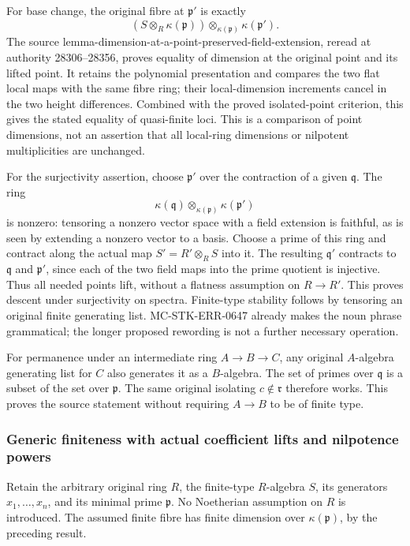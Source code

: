 For base change, the original fibre at \(\mathfrak p'\) is exactly \[
 (S\otimes_R\kappa(\mathfrak p))
       \otimes_{\kappa(\mathfrak p)}\kappa(\mathfrak p').
\] The source lemma-dimension-at-a-point-preserved-field-extension, reread at authority 28306--28356, proves equality of dimension at the original point and its lifted point. It retains the polynomial presentation and compares the two flat local maps with the same fibre ring; their local-dimension increments cancel in the two height differences. Combined with the proved isolated-point criterion, this gives the stated equality of quasi-finite loci. This is a comparison of point dimensions, not an assertion that all local-ring dimensions or nilpotent multiplicities are unchanged.

For the surjectivity assertion, choose \(\mathfrak p'\) over the contraction of a given \(\mathfrak q\). The ring \[
 \kappa(\mathfrak q)\otimes_{\kappa(\mathfrak p)}
       \kappa(\mathfrak p')
\] is nonzero: tensoring a nonzero vector space with a field extension is faithful, as is seen by extending a nonzero vector to a basis. Choose a prime of this ring and contract along the actual map \(S'=R'\otimes_RS\) into it. The resulting \(\mathfrak q'\) contracts to \(\mathfrak q\) and \(\mathfrak p'\), since each of the two field maps into the prime quotient is injective. Thus all needed points lift, without a flatness assumption on \(R\to R'\). This proves descent under surjectivity on spectra. Finite-type stability follows by tensoring an original finite generating list. MC-STK-ERR-0647 already makes the noun phrase grammatical; the longer proposed rewording is not a further necessary operation.

For permanence under an intermediate ring \(A\to B\to C\), any original \(A\)-algebra generating list for \(C\) also generates it as a \(B\)-algebra. The set of primes over \(\mathfrak q\) is a subset of the set over \(\mathfrak p\). The same original isolating \(c\notin\mathfrak r\) therefore works. This proves the source statement without requiring \(A\to B\) to be of finite type.

\subsubsection{Generic finiteness with actual coefficient lifts and nilpotence powers}\label{generic-finiteness-with-actual-coefficient-lifts-and-nilpotence-powers}

Retain the arbitrary original ring \(R\), the finite-type \(R\)-algebra \(S\), its generators \(x_1,\ldots,x_n\), and its minimal prime \(\mathfrak p\). No Noetherian assumption on \(R\) is introduced. The assumed finite fibre has finite dimension over \(\kappa(\mathfrak p)\), by the preceding result.

